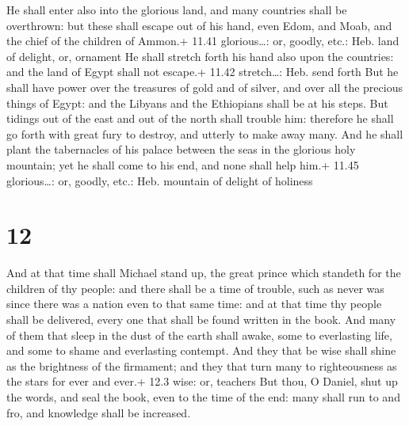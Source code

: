  He shall enter also into the glorious land, and many
countries shall be overthrown: but these shall escape out of his hand,
even Edom, and Moab, and the chief of the children of Ammon.+ 11.41
glorious\ldots: or, goodly, etc.: Heb. land of delight, or, ornament
 He shall stretch forth his hand also upon the countries:
and the land of Egypt shall not escape.+ 11.42 stretch\ldots: Heb. send
forth  But he shall have power over the treasures of gold
and of silver, and over all the precious things of Egypt: and the
Libyans and the Ethiopians shall be at his steps.  But
tidings out of the east and out of the north shall trouble him:
therefore he shall go forth with great fury to destroy, and utterly to
make away many.  And he shall plant the tabernacles of his
palace between the seas in the glorious holy mountain; yet he shall come
to his end, and none shall help him.+ 11.45 glorious\ldots: or, goodly,
etc.: Heb. mountain of delight of holiness

\hypertarget{section-11}{%
\section{12}\label{section-11}}

 And at that time shall Michael stand up, the great prince
which standeth for the children of thy people: and there shall be a time
of trouble, such as never was since there was a nation even to that same
time: and at that time thy people shall be delivered, every one that
shall be found written in the book.  And many of them that
sleep in the dust of the earth shall awake, some to everlasting life,
and some to shame and everlasting contempt.  And they that
be wise shall shine as the brightness of the firmament; and they that
turn many to righteousness as the stars for ever and ever.+ 12.3 wise:
or, teachers  But thou, O Daniel, shut up the words, and
seal the book, even to the time of the end: many shall run to and fro,
and knowledge shall be increased.

